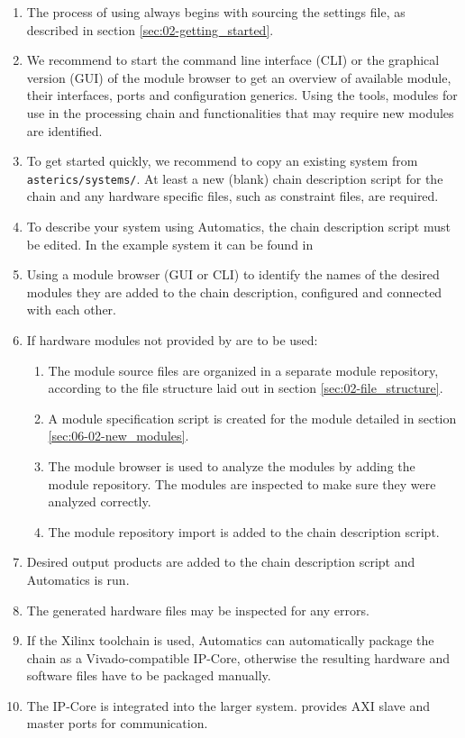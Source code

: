 \begin{enumerate}
\item The process of using \asterics always begins with sourcing the \asterics settings file, as described in section \ref{sec:02-getting_started}.
\item We recommend to start the command line interface (CLI) or the graphical version (GUI) of the \asterics module browser to get an overview of available \asterics module, their interfaces, ports and configuration generics.
Using the tools, \asterics modules for use in the processing chain and functionalities that may require new modules are identified.
\item To get started quickly, we recommend to copy an existing system from \texttt{asterics/systems/}.
At least a new (blank) chain description script for the \asterics chain and any hardware specific files, such as constraint files, are required.
\item To describe your system using Automatics, the chain description script must be edited.
In the example system it can be found in 
\item Using a module browser (GUI or CLI) to identify the names of the desired modules they are added to the chain description, configured and connected with each other.
\item If hardware modules not provided by \asterics are to be used:
	\begin{enumerate}
	\item The module source files are organized in a separate module repository, according to the file structure laid out in section \ref{sec:02-file_structure}.
	\item A module specification script is created for the module detailed in section \ref{sec:06-02-new_modules}.
	\item The module browser is used to analyze the modules by adding the module repository.
	The modules are inspected to make sure they were analyzed correctly.
	\item The module repository import is added to the chain description script.
	\end{enumerate}
\item Desired output products are added to the chain description script and Automatics is run.
\item The generated hardware files may be inspected for any errors.
\item If the Xilinx toolchain is used, Automatics can automatically package the \asterics chain as a Vivado-compatible IP-Core, otherwise the resulting hardware and software files have to be packaged manually.
\item The \asterics IP-Core is integrated into the larger system. \asterics provides AXI slave and master ports for communication.
\end{enumerate}

